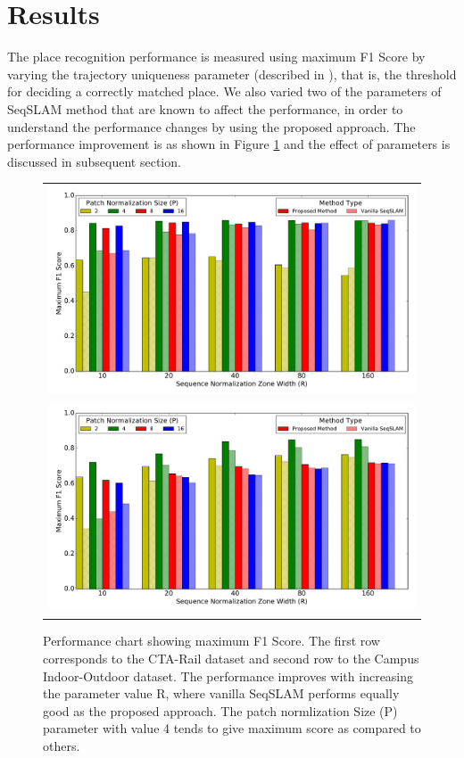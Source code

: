 \documentclass[letterpaper, 10 pt, conference]{ieeeconf}  %
\begin{document}
\section{Results}
The place recognition performance is measured using maximum F1 Score by varying the trajectory uniqueness parameter (described in \cite{Milford2012}), that is, the threshold for deciding a correctly matched place. We also varied two of the parameters of SeqSLAM method that are known to affect the performance, in order to understand the performance changes by using the proposed approach. The performance improvement is as shown in Figure \ref{fig:performanceChart} and the effect of parameters is discussed in subsequent section. 

\begin{figure}[t]
\centering
\begin{tabular}[t]{c}
\includegraphics[scale=0.5]{cta-bar-graph}\\
\includegraphics[scale=0.5]{campus-io-bar-graph}
\end{tabular}
 \caption{Performance chart showing maximum F1 Score. The first row corresponds to the CTA-Rail dataset and second row to the Campus Indoor-Outdoor dataset. The performance improves with increasing the parameter value R, where vanilla SeqSLAM performs equally good as the proposed approach. The patch normlization Size (P) parameter with value 4 tends to give maximum score as compared to others.}
 \label{fig:performanceChart}
\end{figure}
\end{document}
